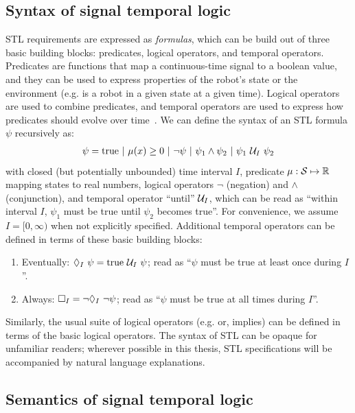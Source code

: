 \subsection{Syntax of signal temporal logic}

STL requirements are expressed as \textit{formulas}, which can be build out of three basic building blocks: predicates, logical operators, and temporal operators. Predicates are functions that map a continuous-time signal to a boolean value, and they can be used to express properties of the robot's state or the environment (e.g. is a robot in a given state at a given time). Logical operators are used to combine predicates, and temporal operators are used to express how predicates should evolve over time~\cite{donzeEfficientRobustMonitoring2013a}. We can define the syntax of an STL formula $\psi$ recursively as:
\begin{align}
    \psi = \text{true}\ |\ \mu(x) \geq 0\ |\ \neg \psi\ |\ \psi_1 \wedge \psi_2\ |\ \psi_1 \ \mathcal{U}_I\ \psi_2\label{ch:iros:stl_syntax}
\end{align}
with closed (but potentially unbounded) time interval $I$, predicate $\mu: \mathcal{S} \mapsto \mathbb{R}$ mapping states to real numbers, logical operators $\neg$ (negation) and $\wedge$ (conjunction), and temporal operator ``until'' $\mathcal{U}_I$, which can be read as ``within interval $I$, $\psi_1$ must be true until $\psi_2$ becomes true''. For convenience, we assume $I = [0, \infty)$ when not explicitly specified. Additional temporal operators can be defined in terms of these basic building blocks:
\begin{enumerate}
    \item Eventually: $\lozenge_I\ \psi = \text{true } \mathcal{U}_I\ \psi$; read as ``$\psi$ must be true at least once during $I$''.
    \item Always: $\square_I = \neg \lozenge_I\ \neg \psi$; read as ``$\psi$ must be true at all times during $I$''.
\end{enumerate}
Similarly, the usual suite of logical operators (e.g. or, implies) can be defined in terms of the basic logical operators. The syntax of STL can be opaque for unfamiliar readers; wherever possible in this thesis, STL specifications will be accompanied by natural language explanations.

\subsection{Semantics of signal temporal logic}

